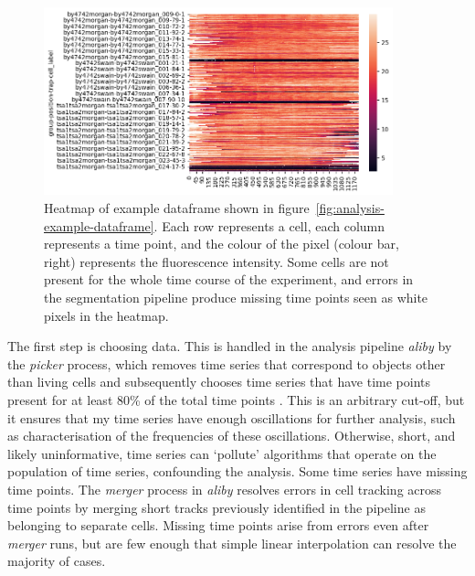 \begin{figure}
  \centering
  \includegraphics[width=0.9\textwidth]{example_dataframe_heatmap}
  \caption{
    Heatmap of example dataframe shown in figure~\ref{fig:analysis-example-dataframe}.
    Each row represents a cell, each column represents a time point, and the colour of the pixel (colour bar, right) represents the fluorescence intensity.
    Some cells are not present for the whole time course of the experiment, and errors in the segmentation pipeline produce missing time points seen as white pixels in the heatmap.
  }
  \label{fig:analysis-example-heatmap}
\end{figure}

The first step is choosing data.
This is handled in the analysis pipeline \textit{aliby} by the \textit{picker} process, which removes time series that correspond to objects other than living cells and subsequently chooses time series that have time points present for at least 80\% of the total time points \parencite{munozgonzalezPhenotypingSingleCells2023}.
This is an arbitrary cut-off, but it ensures that my time series have enough oscillations for further analysis, such as characterisation of the frequencies of these oscillations.
Otherwise, short, and likely uninformative, time series can `pollute' algorithms that operate on the population of time series, confounding the analysis.
Some time series have missing time points.
The \textit{merger} process in \textit{aliby} resolves errors in cell tracking across time points by merging short tracks previously identified in the pipeline as belonging to separate cells.
Missing time points arise from errors even after \textit{merger} runs, but are few enough that simple linear interpolation can resolve the majority of cases.


